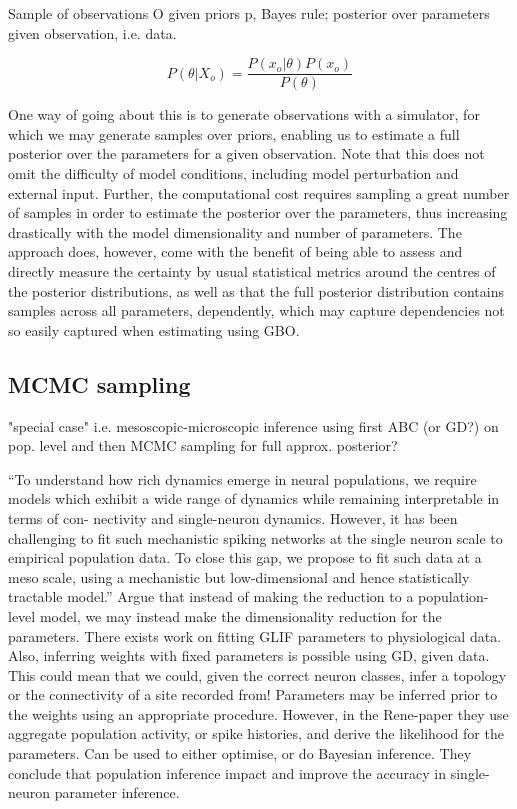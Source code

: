 \documentclass[mphil,deptreport,ai]{infthesis} %
\begin{document}
Sample of observations O given priors p, Bayes rule; posterior over parameters given observation, i.e. data.

\begin{equation}
    P(\theta|X_o) = \frac{P(x_o|\theta)P(x_o)}{P(\theta)}
\end{equation}

One way of going about this is to generate observations with a simulator, for which we may generate samples over priors, enabling us to estimate a full posterior over the parameters for a given observation.
Note that this does not omit the difficulty of model conditions, including model perturbation and external input.
Further, the computational cost requires sampling a great number of samples in order to estimate the posterior over the parameters, thus increasing drastically with the model dimensionality and number of parameters.
The approach does, however, come with the benefit of being able to assess and directly measure the certainty by usual statistical metrics around the centres of the posterior distributions, as well as that the full posterior distribution contains samples across all parameters, dependently, which may capture dependencies not so easily captured when estimating using GBO.

\subsection{MCMC sampling}
\cite{Rene2020} "special case" i.e. mesoscopic-microscopic inference using first ABC (or GD?) on pop. level and then MCMC sampling for full approx. posterior?

“To understand how rich dynamics emerge in neural populations, we require models which exhibit a wide range of dynamics while remaining interpretable in terms of con- nectivity and single-neuron dynamics. However, it has been challenging to fit such mechanistic spiking networks at the single neuron scale to empirical population data. To close this gap, we propose to fit such data at a meso scale, using a mechanistic but low-dimensional and hence statistically tractable model.”
Argue that instead of making the reduction to a population-level model, we may instead make the dimensionality reduction for the parameters.
There exists work on fitting GLIF parameters to physiological data. 
Also, inferring weights with fixed parameters is possible using GD, given data.
This could mean that we could, given the correct neuron classes, infer a topology or the connectivity of a site recorded from!
Parameters may be inferred prior to the weights using an appropriate procedure.
However, in the Rene-paper they use aggregate population activity, or spike histories, and derive the likelihood for the parameters. Can be used to either optimise, or do Bayesian inference.
They conclude that population inference impact and improve the accuracy in single-neuron parameter inference.
\end{document}
